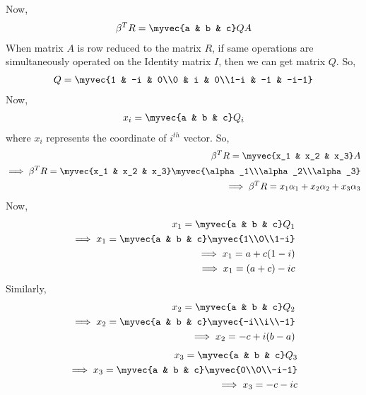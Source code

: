 \documentclass[journal,12pt,twocolumn]{IEEEtran}
\renewcommand\thesection{\arabic{section}}
\begin{document}
Now, 
\begin{align}
\beta^T R = \myvec{a & b & c}Q A
\end{align}
When matrix $A$ is row reduced to the matrix $R$, if same operations are simultaneously operated on the Identity matrix $I$, then we can get matrix $Q$. So,
\begin{align}
Q= \myvec{1 & -i & 0\\0 & i & 0\\1-i & -1 & -i-1}
\end{align}
Now,
\begin{align}
x_i = \myvec{a & b & c}Q_i
\end{align}
where $x_i$ represents the coordinate of $i^{th}$ vector. So,
\begin{align}
\beta^T R = \myvec{x_1 & x_2 & x_3} A\\
\implies \beta^T R = \myvec{x_1 & x_2 & x_3} \myvec{\alpha_1\\\alpha_2\\\alpha_3}\\
\implies \beta^T R = x_1\alpha_1 + x_2\alpha_2+x_3\alpha_3
\end{align}
Now,
\begin{align}
x_1 = \myvec{a & b & c}Q_1\\
\implies x_1 = \myvec{a & b & c} \myvec{1\\0\\1-i}\\
\implies x_1 = a+c(1-i)\\
\implies x_1 = (a+c) - ic
\end{align}
Similarly,
\begin{align}
x_2 = \myvec{a & b & c}Q_2\\
\implies x_2 = \myvec{a & b & c} \myvec{-i\\i\\-1}\\
\implies x_2 = -c + i(b-a)
\end{align}
\begin{align}
x_3 = \myvec{a & b & c}Q_3\\
\implies x_3 = \myvec{a & b & c} \myvec{0\\0\\-i-1}\\
\implies x_3 = -c - ic
\end{align}

\end{document}
